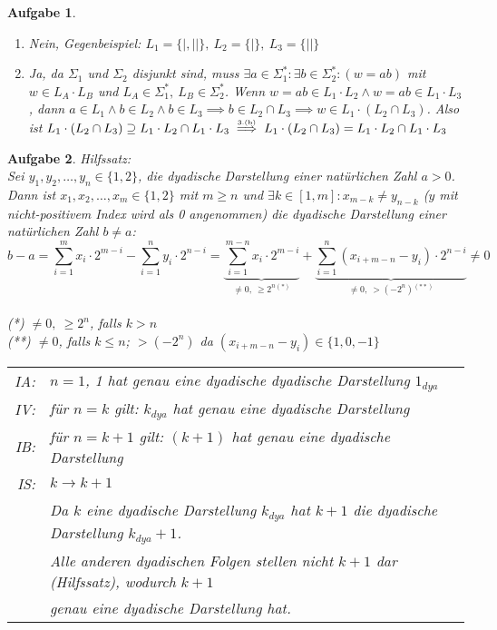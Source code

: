 \documentclass[11pt]{article}
\theoremstyle{break}
\newtheorem{task}{Aufgabe}
\begin{document}
\begin{task}
\hfill\vspace{-5mm}
\begin{enumerate}[label={(\alph*)}]
\item Nein, Gegenbeispiel: $L_1 = \{|,||\},\ L_2 = \{|\},\ L_3 = \{||\}$
\item Ja, da $\Sigma_1$ und $\Sigma_2$ disjunkt sind, muss $\exists a\in\Sigma_1^*:\exists b\in\Sigma_2^*:(w=ab)$ mit $w\in L_A\cdot L_B$ und $L_A\in\Sigma_1^*,\ L_B\in\Sigma_2^*$. Wenn $w = ab \in L_1\cdot L_2 \land w = ab \in L_1\cdot L_3$, dann $a\in L_1 \land b\in L_2 \land b\in L_3 \implies b\in L_2\cap L_3 \implies w\in L_1\cdot (L_2\cap L_3)$.
Also ist $L_1\cdot (L_2\cap L_3)\supseteq L_1\cdot L_2 \cap L_1\cdot L_3\stackrel{\mbox{\tiny 3.(b)}}{\implies}L_1\cdot (L_2\cap L_3) = L_1\cdot L_2 \cap L_1\cdot L_3$
\end{enumerate}
\end{task}

\begin{task}
Hilfssatz:\\
Sei $y_1,y_2,\dots,y_n\in \{1,2\}$,  die dyadische Darstellung einer natürlichen Zahl $a>0$. Dann ist $x_1,x_2,\dots,x_m\in \{1,2\}$ mit $m\geq n$ und $\exists k\in[1,m]:x_{m-k}\neq y_{n-k}$ ($y$ mit nicht-positivem Index wird als 0 angenommen) die dyadische Darstellung einer natürlichen Zahl $b\neq a$:\\
$$b-a = \sum\limits_{i=1}^{m}x_i\cdot 2^{m-i}-\sum\limits_{i=1}^{n}y_i\cdot 2^{n-i}=\underbrace{\sum\limits_{i=1}^{m-n}x_i\cdot 2^{m-i}}_{\neq 0,\ \geq 2^n {}^{(*)}} + \underbrace{\sum\limits_{i=1}^{n}(x_{i+m-n}-y_i)\cdot 2^{n-i}}_{\neq 0 ,\ >(-2^n){}^{(**)}}\neq 0$$\\
(*) $\neq 0,\ \geq 2^n$, falls $k>n$\\
(**) $\neq 0$, falls $k\leq n$; $>(-2^n)$ da $(x_{i+m-n}-y_i)\in\{1,0,-1\}$\vspace{3mm}\\
\begin{tabular}{rl}
IA:&$n=1$, 1 hat genau eine dyadische dyadische Darstellung $1_{dya}$\\
IV:&für $n=k$ gilt: $k_{dya}$ hat genau eine dyadische Darstellung\\
IB:&für $n=k+1$ gilt: $(k+1)$ hat genau eine dyadische Darstellung\\
IS:&$k\rightarrow k+1$\\
&Da $k$ eine dyadische Darstellung $k_{dya}$ hat $k+1$ die dyadische Darstellung $k_{dya}+1$.\\
&Alle anderen dyadischen Folgen stellen nicht $k+1$ dar (Hilfssatz), wodurch $k+1$\\
&genau eine dyadische Darstellung hat.
\end{tabular}\vspace{3mm}
\end{task}
\end{document}
